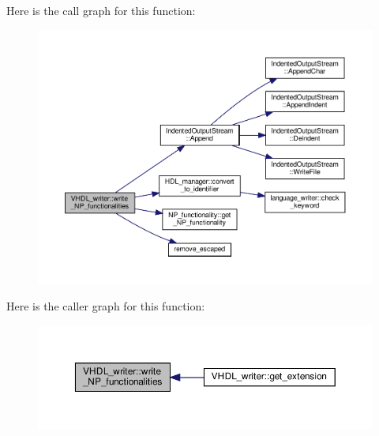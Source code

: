 Here is the call graph for this function\+:
\nopagebreak
\begin{figure}[H]
\begin{center}
\leavevmode
\includegraphics[width=350pt]{d0/d0c/structVHDL__writer_a479a39c4d3b15e8052100fca87a45717_cgraph}
\end{center}
\end{figure}
Here is the caller graph for this function\+:
\nopagebreak
\begin{figure}[H]
\begin{center}
\leavevmode
\includegraphics[width=350pt]{d0/d0c/structVHDL__writer_a479a39c4d3b15e8052100fca87a45717_icgraph}
\end{center}
\end{figure}
\mbox{\label{structVHDL__writer_ab460a8caf690d621561c8ea8705d7438}} 
